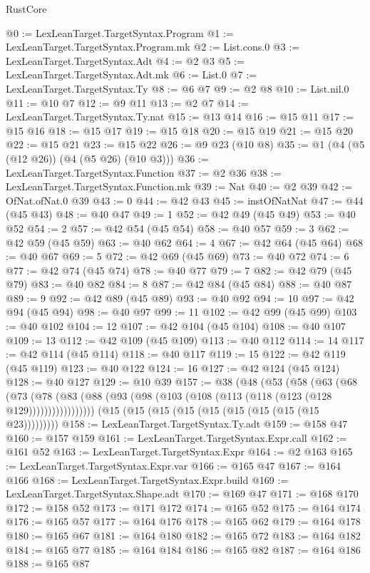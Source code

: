 \begin{lexlean}{RustCore}
\begin{coremodule}
@0 := LexLeanTarget.TargetSyntax.Program
@1 := LexLeanTarget.TargetSyntax.Program.mk
@2 := List.cons.{0}
@3 := LexLeanTarget.TargetSyntax.Adt
@4 := @2 @3
@5 := LexLeanTarget.TargetSyntax.Adt.mk
@6 := List.{0}
@7 := LexLeanTarget.TargetSyntax.Ty
@8 := @6 @7
@9 := @2 @8
@10 := List.nil.{0}
@11 := @10 @7
@12 := @9 @11
@13 := @2 @7
@14 := LexLeanTarget.TargetSyntax.Ty.nat
@15 := @13 @14
@16 := @15 @11
@17 := @15 @16
@18 := @15 @17
@19 := @15 @18
@20 := @15 @19
@21 := @15 @20
@22 := @15 @21
@23 := @15 @22
@26 := @9 @23 (@10 @8)
@35 := @1 (@4 (@5 (@12 @26)) (@4 (@5 @26) (@10 @3)))
@36 := LexLeanTarget.TargetSyntax.Function
@37 := @2 @36
@38 := LexLeanTarget.TargetSyntax.Function.mk
@39 := Nat
@40 := @2 @39
@42 := OfNat.ofNat.{0} @39
@43 := 0
@44 := @42 @43
@45 := instOfNatNat
@47 := @44 (@45 @43)
@48 := @40 @47
@49 := 1
@52 := @42 @49 (@45 @49)
@53 := @40 @52
@54 := 2
@57 := @42 @54 (@45 @54)
@58 := @40 @57
@59 := 3
@62 := @42 @59 (@45 @59)
@63 := @40 @62
@64 := 4
@67 := @42 @64 (@45 @64)
@68 := @40 @67
@69 := 5
@72 := @42 @69 (@45 @69)
@73 := @40 @72
@74 := 6
@77 := @42 @74 (@45 @74)
@78 := @40 @77
@79 := 7
@82 := @42 @79 (@45 @79)
@83 := @40 @82
@84 := 8
@87 := @42 @84 (@45 @84)
@88 := @40 @87
@89 := 9
@92 := @42 @89 (@45 @89)
@93 := @40 @92
@94 := 10
@97 := @42 @94 (@45 @94)
@98 := @40 @97
@99 := 11
@102 := @42 @99 (@45 @99)
@103 := @40 @102
@104 := 12
@107 := @42 @104 (@45 @104)
@108 := @40 @107
@109 := 13
@112 := @42 @109 (@45 @109)
@113 := @40 @112
@114 := 14
@117 := @42 @114 (@45 @114)
@118 := @40 @117
@119 := 15
@122 := @42 @119 (@45 @119)
@123 := @40 @122
@124 := 16
@127 := @42 @124 (@45 @124)
@128 := @40 @127
@129 := @10 @39
@157 := @38
    (@48
      (@53
        (@58
          (@63
            (@68
              (@73
                (@78 (@83 (@88 (@93 (@98 (@103 (@108 (@113 (@118 (@123 (@128 @129)))))))))))))))))
    (@15 (@15 (@15 (@15 (@15 (@15 (@15 (@15 (@15 @23)))))))))
@158 := LexLeanTarget.TargetSyntax.Ty.adt
@159 := @158 @47
@160 := @157 @159
@161 := LexLeanTarget.TargetSyntax.Expr.call
@162 := @161 @52
@163 := LexLeanTarget.TargetSyntax.Expr
@164 := @2 @163
@165 := LexLeanTarget.TargetSyntax.Expr.var
@166 := @165 @47
@167 := @164 @166
@168 := LexLeanTarget.TargetSyntax.Expr.build
@169 := LexLeanTarget.TargetSyntax.Shape.adt
@170 := @169 @47
@171 := @168 @170
@172 := @158 @52
@173 := @171 @172
@174 := @165 @52
@175 := @164 @174
@176 := @165 @57
@177 := @164 @176
@178 := @165 @62
@179 := @164 @178
@180 := @165 @67
@181 := @164 @180
@182 := @165 @72
@183 := @164 @182
@184 := @165 @77
@185 := @164 @184
@186 := @165 @82
@187 := @164 @186
@188 := @165 @87

\end{coremodule}
\end{lexlean}
